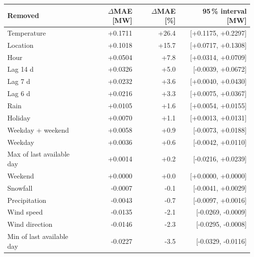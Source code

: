 \begin{tabular}{lrrr}
\toprule
Removed & $\Delta$MAE [MW] & $\Delta$MAE [\%] & 95\,\% interval [MW] \\
\midrule
Temperature & +0.1711 & +26.4 & [+0.1175, +0.2297] \\
Location & +0.1018 & +15.7 & [+0.0717, +0.1308] \\
Hour & +0.0504 & +7.8 & [+0.0314, +0.0709] \\
Lag 14 d & +0.0326 & +5.0 & [-0.0039, +0.0672] \\
Lag 7 d & +0.0232 & +3.6 & [+0.0040, +0.0430] \\
Lag 6 d & +0.0216 & +3.3 & [+0.0075, +0.0367] \\
Rain & +0.0105 & +1.6 & [+0.0054, +0.0155] \\
Holiday & +0.0070 & +1.1 & [+0.0013, +0.0131] \\
Weekday + weekend & +0.0058 & +0.9 & [-0.0073, +0.0188] \\
Weekday & +0.0036 & +0.6 & [-0.0042, +0.0110] \\
Max of last available day & +0.0014 & +0.2 & [-0.0216, +0.0239] \\
Weekend & +0.0000 & +0.0 & [+0.0000, +0.0000] \\
Snowfall & -0.0007 & -0.1 & [-0.0041, +0.0029] \\
Precipitation & -0.0043 & -0.7 & [-0.0097, +0.0016] \\
Wind speed & -0.0135 & -2.1 & [-0.0269, -0.0009] \\
Wind direction & -0.0146 & -2.3 & [-0.0295, -0.0008] \\
Min of last available day & -0.0227 & -3.5 & [-0.0329, -0.0116] \\
\bottomrule
\end{tabular}
